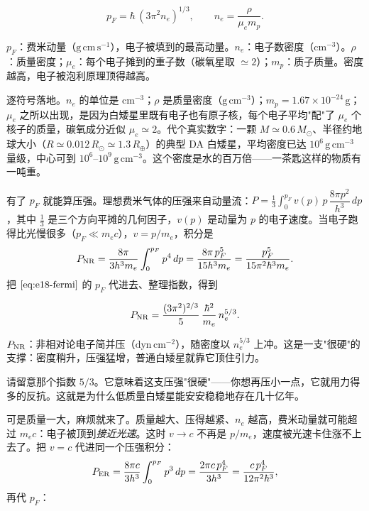 \begin{equation}
  p_F=\hbar\,(3\pi^2 n_e)^{1/3},
  \qquad
  n_e=\frac{\rho}{\mu_e m_p}.
  \label{eq:e18-fermi}
\end{equation}
\begin{formulaexplain}
\(p_F\)：费米动量（\(\mathrm{g\,cm\,s^{-1}}\)），电子被填到的最高动量。\(n_e\)：电子数密度（\(\mathrm{cm^{-3}}\)）。\(\rho\)：质量密度；\(\mu_e\)：每个电子摊到的重子数（碳氧星取 \(\simeq2\)）；\(m_p\)：质子质量。密度越高，电子被泡利原理顶得越高。
\end{formulaexplain}

逐符号落地。\(n_e\) 的单位是 \(\mathrm{cm^{-3}}\)；\(\rho\) 是质量密度（\(\mathrm{g\,cm^{-3}}\)）；\(m_p=1.67\times10^{-24}\,\mathrm{g}\)；\(\mu_e\) 之所以出现，是因为白矮星里既有电子也有原子核，每个电子平均"配"了 \(\mu_e\) 个核子的质量，碳氧成分近似 \(\mu_e\simeq2\)。代个真实数字：一颗 \(M\simeq0.6\,M_\odot\)、半径约地球大小（\(R\simeq0.012\,R_\odot\simeq1.3\,R_\oplus\)）的典型 DA 白矮星，平均密度已达 \(10^6\,\mathrm{g\,cm^{-3}}\) 量级，中心可到 \(10^6\)–\(10^9\,\mathrm{g\,cm^{-3}}\)。这个密度是水的百万倍——一茶匙这样的物质有一吨重。

有了 \(p_F\) 就能算压强。理想费米气体的压强来自动量流：\(P=\tfrac13\int_0^{p_F} v(p)\,p\,\dfrac{8\pi p^2}{h^3}\,dp\)，其中 \(\tfrac13\) 是三个方向平摊的几何因子，\(v(p)\) 是动量为 \(p\) 的电子速度。当电子跑得比光慢很多（\(p_F\ll m_ec\)），\(v=p/m_e\)，积分是
\[
  P_{\rm NR}=\frac{8\pi}{3h^3m_e}\int_0^{p_F}p^4\,dp
           =\frac{8\pi\,p_F^5}{15h^3m_e}
           =\frac{p_F^5}{15\pi^2\hbar^3 m_e}.
\]
把 \(\eqref{eq:e18-fermi}\) 的 \(p_F\) 代进去、整理指数，得到

\begin{equation}
  P_{\rm NR}=\frac{(3\pi^2)^{2/3}}{5}\,
             \frac{\hbar^2}{m_e}\,n_e^{5/3}.
  \label{eq:e18-pnr}
\end{equation}
\begin{formulaexplain}
\(P_{\rm NR}\)：非相对论电子简并压（\(\mathrm{dyn\,cm^{-2}}\)），随密度以 \(n_e^{5/3}\) 上冲。这是一支"很硬"的支撑：密度稍升，压强猛增，普通白矮星就靠它顶住引力。
\end{formulaexplain}

请留意那个指数 \(5/3\)。它意味着这支压强"很硬"——你想再压小一点，它就用力得多的反抗。这就是为什么低质量白矮星能安安稳稳地存在几十亿年。

可是质量一大，麻烦就来了。质量越大、压得越紧、\(n_e\) 越高，费米动量就可能超过 \(m_ec\)：电子被顶到\emph{接近光速}。这时 \(v\to c\) 不再是 \(p/m_e\)，速度被光速卡住涨不上去了。把 \(v=c\) 代进同一个压强积分：
\[
  P_{\rm ER}=\frac{8\pi c}{3h^3}\int_0^{p_F}p^3\,dp
           =\frac{2\pi c\,p_F^4}{3h^3}
           =\frac{c\,p_F^4}{12\pi^2\hbar^3},
\]
再代 \(p_F\)：

